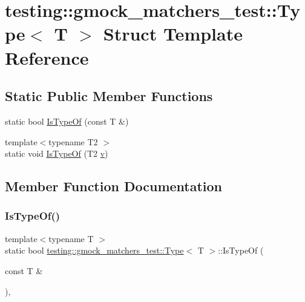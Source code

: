 \hypertarget{structtesting_1_1gmock__matchers__test_1_1_type}{}\section{testing\+::gmock\+\_\+matchers\+\_\+test\+::Type$<$ T $>$ Struct Template Reference}
\label{structtesting_1_1gmock__matchers__test_1_1_type}
\subsection*{Static Public Member Functions}
\begin{DoxyCompactItemize}
\item 
static bool \mbox{\hyperlink{structtesting_1_1gmock__matchers__test_1_1_type_ad0b8d166a185471db49aa9009520d74f}{Is\+Type\+Of}} (const T \&)
\item 
{\footnotesize template$<$typename T2 $>$ }\\static void \mbox{\hyperlink{structtesting_1_1gmock__matchers__test_1_1_type_a5451b10be4ff47bd2dc3741eb70dde59}{Is\+Type\+Of}} (T2 \mbox{\hyperlink{_important_values_8h_aaad811047eb9ea3edb6ec2bbeddb2b2b}{v}})
\end{DoxyCompactItemize}


\subsection{Member Function Documentation}
\mbox{\label{structtesting_1_1gmock__matchers__test_1_1_type_ad0b8d166a185471db49aa9009520d74f}} 
\subsubsection{\texorpdfstring{IsTypeOf()}{IsTypeOf()}\hspace{0.1cm}{\footnotesize\ttfamily [1/2]}}
{\footnotesize\ttfamily template$<$typename T $>$ \\
static bool \mbox{\hyperlink{structtesting_1_1gmock__matchers__test_1_1_type}{testing\+::gmock\+\_\+matchers\+\_\+test\+::\+Type}}$<$ T $>$\+::Is\+Type\+Of (\begin{DoxyParamCaption}\item[{const T \&}]{ }\end{DoxyParamCaption})\hspace{0.3cm}{\ttfamily [inline]}, {\ttfamily [static]}}

